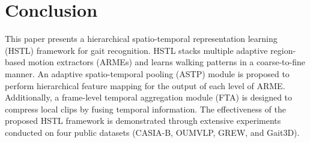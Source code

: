\documentclass[10pt,twocolumn,letterpaper]{article}
\begin{document}


\section{Conclusion}
\label{sec:conclu}
This paper presents a hierarchical spatio-temporal representation learning (HSTL) framework for gait recognition. HSTL stacks multiple adaptive region-based motion extractors (ARMEs) and learns walking patterns in a coarse-to-fine manner. An adaptive spatio-temporal pooling (ASTP) module is proposed to perform hierarchical feature mapping for the output of each level of ARME. Additionally, a frame-level temporal aggregation module (FTA) is designed to compress local clips by fusing temporal information. The effectiveness of the proposed HSTL framework is demonstrated through extensive experiments conducted on four public datasets (CASIA-B, OUMVLP, GREW, and Gait3D).
\end{document}
